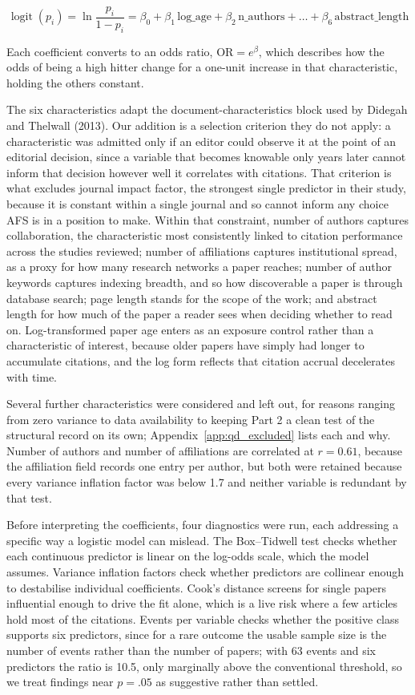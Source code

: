 \documentclass[11pt,a4paper]{article}
\begin{document}
\[\operatorname{logit}(p_i) = \ln\frac{p_i}{1 - p_i} = \beta_0 + \beta_1\,\text{log\_age} + \beta_2\,\text{n\_authors} + \dots + \beta_6\,\text{abstract\_length}\]

Each coefficient converts to an odds ratio, \(\text{OR} = e^{\beta}\), which describes how the odds of being a high hitter change for a one-unit increase in that characteristic, holding the others constant.

The six characteristics adapt the document-characteristics block used by Didegah and Thelwall (2013). Our addition is a selection criterion they do not apply: a characteristic was admitted only if an editor could observe it at the point of an editorial decision, since a variable that becomes knowable only years later cannot inform that decision however well it correlates with citations. That criterion is what excludes journal impact factor, the strongest single predictor in their study, because it is constant within a single journal and so cannot inform any choice AFS is in a position to make. Within that constraint, number of authors captures collaboration, the characteristic most consistently linked to citation performance across the studies reviewed; number of affiliations captures institutional spread, as a proxy for how many research networks a paper reaches; number of author keywords captures indexing breadth, and so how discoverable a paper is through database search; page length stands for the scope of the work; and abstract length for how much of the paper a reader sees when deciding whether to read on. Log-transformed paper age enters as an exposure control rather than a characteristic of interest, because older papers have simply had longer to accumulate citations, and the log form reflects that citation accrual decelerates with time.

Several further characteristics were considered and left out, for reasons ranging from zero variance to data availability to keeping Part 2 a clean test of the structural record on its own; Appendix~\ref{app:qd_excluded} lists each and why. Number of authors and number of affiliations are correlated at $r = 0.61$, because the affiliation field records one entry per author, but both were retained because every variance inflation factor was below 1.7 and neither variable is redundant by that test.

Before interpreting the coefficients, four diagnostics were run, each addressing a specific way a logistic model can mislead. The Box--Tidwell test checks whether each continuous predictor is linear on the log-odds scale, which the model assumes. Variance inflation factors check whether predictors are collinear enough to destabilise individual coefficients. Cook's distance screens for single papers influential enough to drive the fit alone, which is a live risk where a few articles hold most of the citations. Events per variable checks whether the positive class supports six predictors, since for a rare outcome the usable sample size is the number of events rather than the number of papers; with 63 events and six predictors the ratio is 10.5, only marginally above the conventional threshold, so we treat findings near $p = .05$ as suggestive rather than settled.
\end{document}
